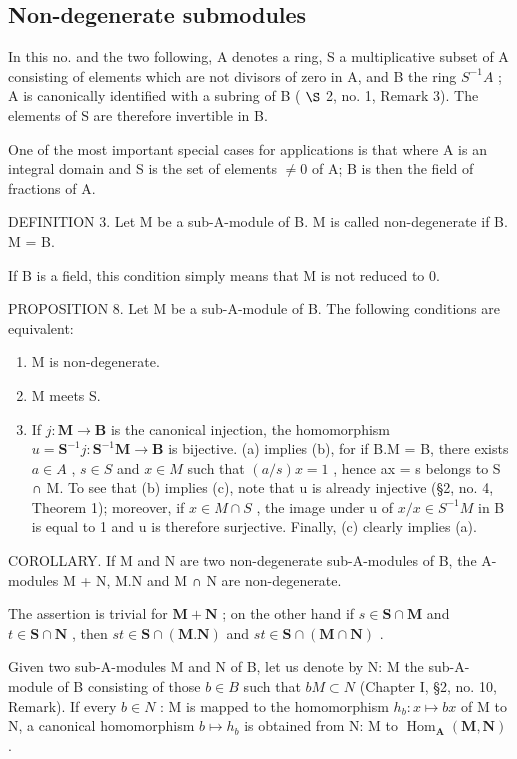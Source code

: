 \subsection{Non-degenerate submodules}

In this no. and the two following, A denotes a ring, S a multiplicative subset of A consisting of elements which are not divisors of zero in A, and B the ring \(S^{-1}A\) ; A is canonically identified with a subring of B ( \(\S\) 2, no. 1, Remark 3). The elements of S are therefore invertible in B.

One of the most important special cases for applications is that where A is an integral domain and S is the set of elements \(\neq0\) of A; B is then the field of fractions of A.

DEFINITION 3. Let M be a sub-A-module of B. M is called non-degenerate if B. M = B.

If B is a field, this condition simply means that M is not reduced to 0.

PROPOSITION 8. Let M be a sub-A-module of B. The following conditions are equivalent:

\begin{enumerate}
\def\labelenumi{(\alph{enumi})}
\item
  M is non-degenerate.
\item
  M meets S.
\item
  If \(j: \mathbf{M} \to \mathbf{B}\) is the canonical injection, the homomorphism \(u = \mathbf{S}^{-1}j: \mathbf{S}^{-1}\mathbf{M} \to \mathbf{B}\) is bijective.
  (a) implies (b), for if B.M = B, there exists \(a \in A\) , \(s \in S\) and \(x \in M\) such that \((a/s)x = 1\) , hence ax = s belongs to S ∩ M. To see that (b) implies (c), note that u is already injective (§2, no. 4, Theorem 1); moreover, if \(x \in M \cap S\) , the image under u of \(x/x \in S^{-1}M\) in B is equal to 1 and u is therefore surjective. Finally, (c) clearly implies (a).
\end{enumerate}

COROLLARY. If M and N are two non-degenerate sub-A-modules of B, the A-modules M + N, M.N and M ∩ N are non-degenerate.

The assertion is trivial for \(\mathbf{M} + \mathbf{N}\) ; on the other hand if \(s \in \mathbf{S} \cap \mathbf{M}\) and \(t \in \mathbf{S} \cap \mathbf{N}\) , then \(st \in \mathbf{S} \cap (\mathbf{M}. \mathbf{N})\) and \(st \in \mathbf{S} \cap (\mathbf{M} \cap \mathbf{N})\) .

Given two sub-A-modules M and N of B, let us denote by N: M the sub-A-module of B consisting of those \(b \in B\) such that \(bM \subset N\) (Chapter I, §2, no. 10, Remark). If every \(b \in N\) : M is mapped to the homomorphism \(h_{b}: x \mapsto bx\) of M to N, a canonical homomorphism \(b \mapsto h_{b}\) is obtained from N: M to \(\operatorname{Hom}_{\mathbf{A}}(\mathbf{M}, \mathbf{N})\) .

